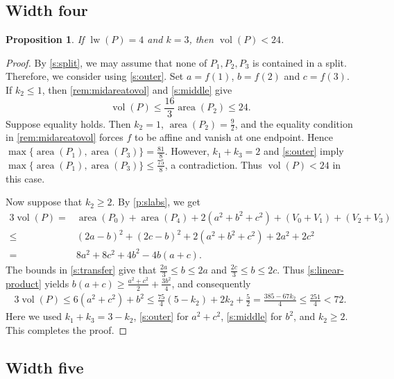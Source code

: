 \documentclass[reqno, 11pt]{article}
\numberwithin{equation}{section}
\newtheorem{proposition}[proposition]{Proposition}
\theoremstyle{definition}
\DeclareMathOperator{\vol}{vol}
\DeclareMathOperator{\area}{area}
\DeclareMathOperator{\lw}{lw}
\numberwithin{equation}{section}
\begin{document}
\subsection{Width four}

\begin{proposition}\label{s:four}
If $\lw(P)=4$ and $k=3$, then $\vol(P)<24$.
\end{proposition}
\begin{proof}
By \eqref{s:split}, we may assume that none of $P_1,P_2,P_3$ is contained in a split. 
Therefore, we consider using \eqref{s:outer}. Set $a=f(1)$, $b=f(2)$ and $c=f(3)$.
If $k_2\le1$, then \cref{rem:midareatovol} and \eqref{s:middle} give
\[
 \vol(P)\le\frac{16}{3}\area(P_2)\le24.
\]
Suppose equality holds. Then $k_2=1$,
$\area(P_2)=\frac{9}{2}$, and the equality condition
in \cref{rem:midareatovol} forces $f$ to be
affine and vanish at one endpoint. Hence $\max\{\area(P_1),\area(P_3)\}=\frac{81}{8}$.
However, $k_1+k_3=2$ and \eqref{s:outer} imply $\max\{\area(P_1),\area(P_3)\}
\le\frac{75}{8}$, a contradiction. Thus $\vol(P)<24$ in this case.

Now suppose that $k_2\ge2$. By \cref{p:slabs}, we get
\begin{align*}
 3\vol(P)=&\area(P_0)+\area(P_4)+2(a^2+b^2+c^2)+(V_0+V_1)+(V_2+V_3)\\
 \le&(2a-b)^2+(2c-b)^2+2(a^2+b^2+c^2)+2a^2+2c^2\\
 =&8a^2+8c^2+4b^2-4b(a+c).
\end{align*}
The bounds in \eqref{s:transfer} give that $\frac{2a}{3}\le b\le2a$ and
$\frac{2c}{3}\le b\le2c$. Thus \eqref{s:linear-product} yields
$b(a+c)\ge\frac{a^2+c^2}{2}+\frac{3b^2}{4}$, and consequently
\begin{align*}
 3\vol(P)\le6(a^2+c^2)+b^2\le\frac{75}{4}(5-k_2)+2k_2+\frac52
 =\frac{385-67k_2}{4}\le\frac{251}{4}<72.
\end{align*}
Here we used $k_1+k_3=3-k_2$, \eqref{s:outer} for $a^2+c^2$, \eqref{s:middle} for $b^2$, and $k_2\ge2$.
This completes the proof. 
\end{proof}

\subsection{Width five}
\end{document}
